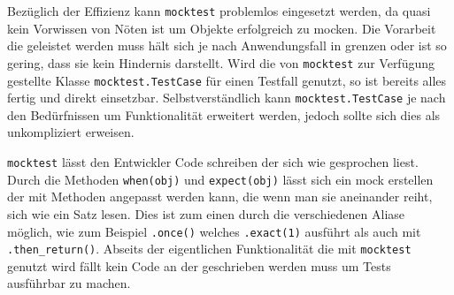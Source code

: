 Bezüglich der Effizienz kann \lstinline{mocktest} problemlos eingesetzt werden,
da quasi kein Vorwissen von Nöten ist um Objekte erfolgreich zu \gls{mock}en.
Die Vorarbeit die geleistet werden muss hält sich je nach Anwendungsfall in
grenzen oder ist so gering, dass sie kein Hindernis darstellt. Wird die von
\lstinline{mocktest} zur Verfügung gestellte Klasse
\lstinline{mocktest.TestCase} für einen Testfall genutzt, so ist bereits alles
fertig und direkt einsetzbar. Selbstverständlich kann
\lstinline{mocktest.TestCase} je nach den Bedürfnissen um Funktionalität
erweitert werden, jedoch sollte sich dies als unkompliziert erweisen.

\lstinline{mocktest} lässt den Entwickler Code schreiben der sich wie gesprochen
liest. Durch die Methoden \lstinline{when(obj)} und \lstinline{expect(obj)}
lässt sich ein \Gls{mock} erstellen der mit Methoden angepasst werden
kann, die wenn man sie aneinander reiht, sich wie ein Satz lesen. Dies ist zum
einen durch die verschiedenen Aliase möglich, wie zum Beispiel \lstinline{.once()}
welches \lstinline{.exact(1)} ausführt als auch mit \lstinline{.then_return()}.
Abseits der eigentlichen Funktionalität die mit \lstinline{mocktest} genutzt wird
fällt kein Code an der geschrieben werden muss um Tests ausführbar zu machen.